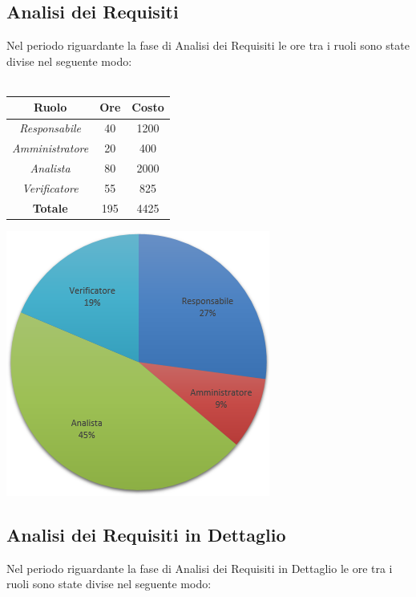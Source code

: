 \subsection{Analisi dei Requisiti}
Nel periodo riguardante la fase di Analisi dei Requisiti le ore tra i ruoli sono state divise nel seguente modo: \\ \\

\begin{center}
  \centering
  \begin{tabular}{|c|c|c|}
    \hline
    \textbf{Ruolo} & \textbf{Ore} & \textbf{Costo} \\
    \hline
     \emph{Responsabile}  & 40 & 1200 \\
    \hline  \emph{Amministratore}  & 20 & 400 \\
    \hline  \emph{Analista}  & 80 & 2000 \\
    \hline  \emph{Verificatore}  & 55 & 825 \\
    \hline
    \textbf{Totale} & 195 & 4425 \\
    \hline
  \end{tabular}
  \includegraphics[scale=0.7]{img/1-AnalisiRequisiti.png}
\end{center}

\subsection{Analisi dei Requisiti in Dettaglio}
Nel periodo riguardante la fase di Analisi dei Requisiti in Dettaglio le ore tra i ruoli sono state divise nel seguente modo: \\ \\

